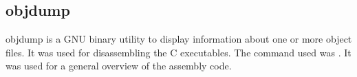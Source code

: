 \subsection{objdump}
objdump is a GNU binary utility to display information about one or more object files. It was used for disassembling the C executables. The command used was . It was used for a general overview of the assembly code.
